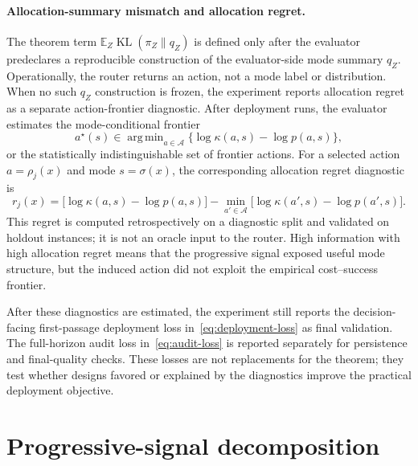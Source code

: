 \documentclass{article}
\DeclareMathOperator*{\argmin}{arg\,min}
\DeclareMathOperator{\KL}{KL}
\newcommand{\cA}{\mathcal{A}}
\newcommand{\E}{\mathbb{E}}
\begin{document}
\paragraph{Allocation-summary mismatch and allocation regret.}
The theorem term $\E_Z\KL(\pi_Z\|q_Z)$ is defined only after the evaluator predeclares a reproducible construction of the evaluator-side mode summary $q_Z$.
Operationally, the router returns an action, not a mode label or distribution.
When no such $q_Z$ construction is frozen, the experiment reports allocation regret as a separate action-frontier diagnostic.
After deployment runs, the evaluator estimates the mode-conditional frontier
\[
a^\star(s)\in\argmin_{a\in\cA}\{\log\kappa(a,s)-\log p(a,s)\},
\]
or the statistically indistinguishable set of frontier actions.
For a selected action $a=\rho_j(x)$ and mode $s=\sigma(x)$, the corresponding allocation regret diagnostic is
\[
r_j(x)
=
\bigl[\log\kappa(a,s)-\log p(a,s)\bigr]
-
\min_{a'\in\cA}\bigl[\log\kappa(a',s)-\log p(a',s)\bigr].
\]
This regret is computed retrospectively on a diagnostic split and validated on holdout instances; it is not an oracle input to the router.
High information with high allocation regret means that the progressive signal exposed useful mode structure, but the induced action did not exploit the empirical cost--success frontier.

After these diagnostics are estimated, the experiment still reports the decision-facing first-passage deployment loss in~\eqref{eq:deployment-loss} as final validation.
The full-horizon audit loss in~\eqref{eq:audit-loss} is reported separately for persistence and final-quality checks.
These losses are not replacements for the theorem; they test whether designs favored or explained by the diagnostics improve the practical deployment objective.

\section{Progressive-signal decomposition}
\label{app:operational-decomp}
\end{document}
